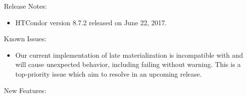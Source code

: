 \noindent Release Notes:

\begin{itemize}

\item HTCondor version 8.7.2 released on June 22, 2017.

\end{itemize}

\noindent Known Issues:

\begin{itemize}

\item Our current implementation of late materialization is incompatible with
 and will cause unexpected behavior, including failing without
warning. This is a top-priority issue which aim to resolve in an upcoming
release.

\end{itemize}

\noindent New Features:

